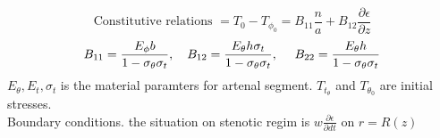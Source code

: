 \documentclass[12pt]{report}
\newcommand{\sps}{\\[0.2cm]}
\newcommand{\NI}{\noindent}
\begin{document}
	\begin{equation}
		\text{Constitutive relations } = T_0 - T_{\phi_0} = B_{11}\frac{n}{a} + B_{12}\frac{\partial \epsilon}{\partial z}
	\end{equation}
	\begin{eqnarray}
		B_{11} = \frac{E_\phi b}{1-\sigma_\theta\sigma_t}, ~~~ B_{12}=\frac{E_\theta h \sigma_t}{1-\sigma_\theta\sigma_t}, ~~~~ B_{22}=\frac{E_\theta h}{1-\sigma_\theta\sigma_t} \notag
	\end{eqnarray}
	$E_\theta, E_t, \sigma_t$ is the material paramters for artenal segment. $T_{t_\theta}$ and $T_{\theta_0}$ are initial stresses.\sps
	
	
	\NI Boundary conditions. the situation on stenotic regim is $w\frac{\partial \epsilon}{\partial dt}$ on $r =R(z)$ 
	



	
	
\end{document}
